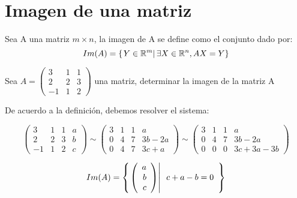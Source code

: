 \newpage
\section{Imagen de una matriz}
\begin{dfn}
Sea A una matriz $m\times n$, la imagen de A se define como el conjunto dado por:
~\\
\[Im(A)=\left\{ \left. Y \in \mathbb{R}^m \right| \exists X \in \mathbb{R}^n,   AX=Y \right\}\]
\end{dfn}


\begin{ejemplo}
Sea $A=
\left(
\begin{array}{rrr}
3&1&1\\
2&2&3\\
-1&1&2
\end{array}
\right)$ una matriz, determinar la imagen de la matriz A
 
De acuerdo a la definición, debemos resolver el sistema:

\[
\left(
\begin{array}{rrr|r}
3&1&1&a\\
2&2&3&b\\
-1&1&2&c
\end{array}
\right)
\sim
\left(
\begin{array}{rrr|r}
3&1&1&a\\
0&4&7&3b-2a\\
0&4&7&3c+a
\end{array}
\right)
\sim
\left(
\begin{array}{rrr|r}
3&1&1&a\\
0&4&7&3b-2a\\
0&0&0&3c+3a-3b
\end{array}
\right)
\]

\[Im(A)=\left\{ \left. \left( \begin{array}{r} a\\ b\\ c \end{array} \right) \right| \begin{array}{r}
c+a-b=0\\
\end{array} \right\}
\]

\end{ejemplo}

